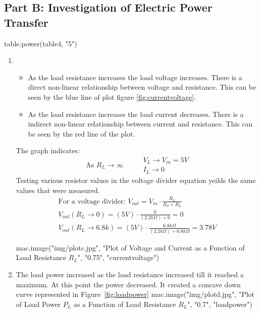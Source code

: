 {{{{{{{\subsection{Part B: Investigation of Electric Power Transfer }
\label{sub:Part B}
{{ table.power(table4, "5")}}
\begin{enumerate}
  \item \begin{itemize}
    \item As the load resistance increases the load voltage increases.
    There is a direct non-linear relationship between voltage and resistance. This can be seen by the blue line of plot
    figure \ref{fig:currentvoltage}.
    \item As the load resistance increases the load current decreases.
   There is a indirect non-linear relationship between current and resistance. This can be seen by the red line of the plot.
   \end{itemize}
  The graph indicates:
  \begin{equation}
    \text{ As } R_L \to \infty \hspace{1cm} \begin{matrix}
    V_L \to V_{in} = 5 V \\
    I_L \to 0
  \end{matrix}
  \end{equation}
  Testing various resistor values in the voltage divider equation yeilds the same
  values that were measured.
  \begin{gather}
    \text{For a voltage divider: } V_{out} = V_{in} \cdot \frac{R_L}{R_S+R_L} \\
    V_{out}(R_L \to 0) = (5 V) \cdot \frac{0}{(2.2 k \Omega)+0} = 0 \\
    V_{out}(R_L \to 6.8k ) = (5 V) \cdot \frac{6.8 k \Omega}{(2.2 k \Omega)+ 6.8 k \Omega} = 3.78V
  \end{gather}



  {{ mac.image("img/plotc.jpg", "Plot of Voltage and Current as a Function of Load Resistance $R_L$", "0.75", "currentvoltage")}}

  \item The load power increased as the load resistance increased till it reached a maximum.
  At this point the power decreased. It created a concave down curve represented in Figure~\ref{fig:loadpower}
  {{ mac.image("img/plotd.jpg", "Plot of Load Power $P_L$ as a Function of Load Resistance $R_L$", "0.7", "loadpower")}}


\end{enumerate}}}}}}}}
